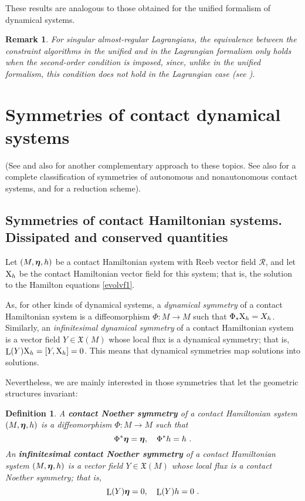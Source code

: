 \documentclass[12pt]{report}
\newtheorem{definition}[teor]{Definition}
\newtheorem{remark}[teor]{Remark}
\def\vf{\mathfrak X}
\def\bmeta{\mbox{\boldmath $\eta$}}
\def\X{{\rm X}}
\def\Lie{\mathop{\rm L}\nolimits}
\newcommand{\Reeb}{\mathcal{R}}
\begin{document}
These results are analogous to those obtained for the unified
formalism of  dynamical systems.

\begin{remark}{\rm
For singular almost-regular Lagrangians, the equivalence between the constraint algorithms 
in the unified and in the Lagrangian formalism
only holds when the second-order condition is imposed,
since, unlike in the unified formalism, this condition does not hold in the Lagrangian case (see \cite{MR-92,SR-83}).
}\end{remark}


\section{Symmetries of contact dynamical systems}
\label{sims}


(See \cite{GGMRR-2019b} and also \cite{DeLeon2019b} for another complementary approach to these topics. See also \cite{GLR-2023} for a complete classification of symmetries of autonomous and nonautonomous contact systems, and \cite{ACLMMP-23} for a reduction scheme).


\subsection{Symmetries of contact Hamiltonian systems. Dissipated and conserved quantities}


Let $(M,\bmeta,h)$ be a contact Hamiltonian system with Reeb vector field $\Reeb$,
and let $\X_h$ be the contact Hamiltonian vector field for this system;
that is, the solution to the Hamilton equations \eqref{evolvf1}.

As, for other kinds of dynamical systems,
a \textsl{dynamical symmetry} of a contact Hamiltonian system  is a diffeomorphism 
$\Phi\colon M\longrightarrow M$ such that $\Phi_*\X_h=X_h$.
Similarly, an \textsl{infinitesimal dynamical symmetry} of a contact Hamiltonian system  is a vector field 
$Y\in\vf(M)$ whose local flux is a dynamical symmetry; that is,
$\Lie(Y)\X_h=[Y,\X_h]=0$.
This means that dynamical symmetries map solutions into solutions.

Nevertheless, we are mainly interested in those symmetries that let
the geometric structures invariant:

\begin{definition}
\label{defsym}
A \textbf{contact Noether symmetry} of a contact Hamiltonian system $(M,\bmeta,h)$ is a diffeomorphism 
$\Phi\colon M\rightarrow M$ such that
$$
\Phi^*\bmeta=\bmeta
,\quad 
\Phi^*h=h \ .
$$
An \textbf{infinitesimal contact Noether symmetry} of a contact Hamiltonian system $(M,\bmeta,h)$ is a vector field 
$Y\in \vf(M)$ whose local flux is a contact Noether symmetry; that is,
$$
\Lie(Y)\bmeta=0
,\quad 
\Lie(Y)h=0 \ .
$$
\end{definition}
\end{document}
